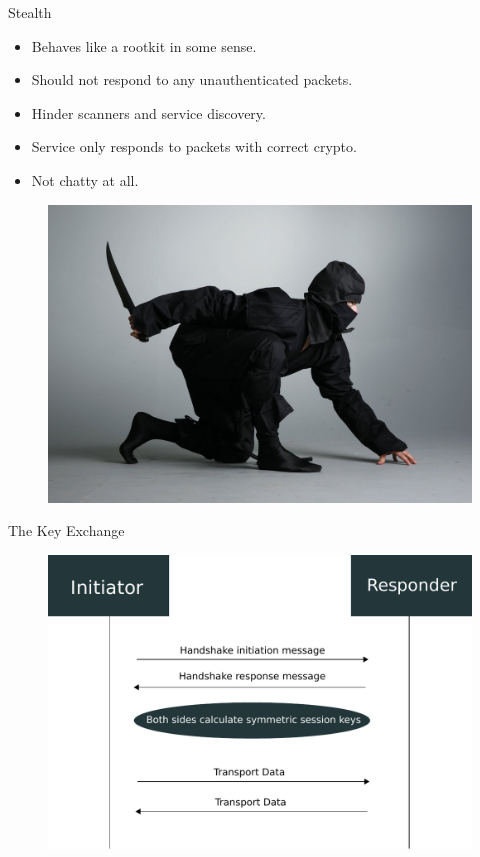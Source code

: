 \documentclass{beamer}
\begin{document}
    \begin{frame}{Stealth}
    	\begin{minipage}{0.6\textwidth}
			\begin{itemize}
				\item Behaves like a rootkit in some sense.
				\item Should not respond to any unauthenticated packets.
				\item Hinder scanners and service discovery.
				\item Service only responds to packets with correct crypto.
				\item Not chatty at all. 
    		\end{itemize} 
		\end{minipage}
		\begin{minipage}{0.37\textwidth}
			\begin{figure}
				\includegraphics[width=\textwidth]{ninja.jpg}
			\end{figure}
		\end{minipage}
    \end{frame}
    \begin{frame}{The Key Exchange}
    	\begin{figure}
			\includegraphics[width=\textwidth]{handshake.pdf}
		\end{figure}
    \end{frame}
\end{document}
